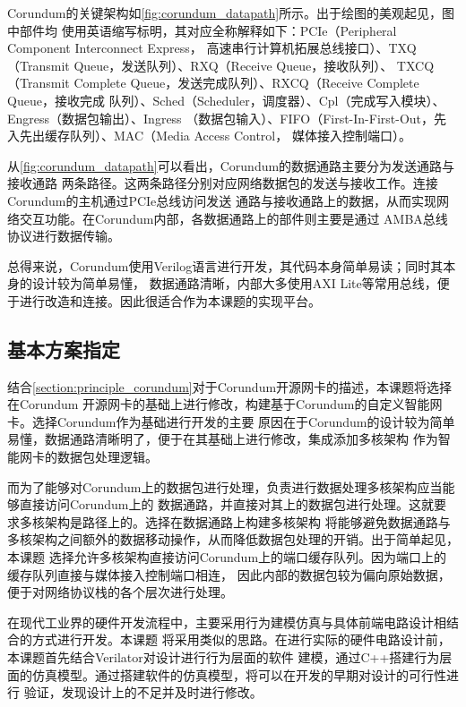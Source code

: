 Corundum的关键架构如\autoref{fig:corundum_datapath}所示。出于绘图的美观起见，图中部件均
使用英语缩写标明，其对应全称解释如下：PCIe（Peripheral Component Interconnect Express，
高速串行计算机拓展总线接口）、TXQ（Transmit Queue，发送队列）、RXQ（Receive Queue，接收队列）、
TXCQ（Transmit Complete Queue，发送完成队列）、RXCQ（Receive Complete Queue，接收完成
队列）、Sched（Scheduler，调度器）、Cpl（完成写入模块）、Engress（数据包输出）、Ingress
（数据包输入）、FIFO（First-In-First-Out，先入先出缓存队列）、MAC（Media Access Control，
媒体接入控制端口）。


从\autoref{fig:corundum_datapath}可以看出，Corundum的数据通路主要分为发送通路与接收通路
两条路径。这两条路径分别对应网络数据包的发送与接收工作。连接Corundum的主机通过PCIe总线访问发送
通路与接收通路上的数据，从而实现网络交互功能。在Corundum内部，各数据通路上的部件则主要是通过
AMBA总线协议\cite{arm2011axi}进行数据传输。

总得来说，Corundum使用Verilog语言进行开发，其代码本身简单易读；同时其本身的设计较为简单易懂，
数据通路清晰，内部大多使用AXI Lite等常用总线，便于进行改造和连接。因此很适合作为本课题的实现平台。

\subsection{基本方案指定}
\label{section:principle_basicpath}


结合\autoref{section:principle_corundum}对于Corundum开源网卡的描述，本课题将选择在Corundum
开源网卡的基础上进行修改，构建基于Corundum的自定义智能网卡。选择Corundum作为基础进行开发的主要
原因在于Corundum的设计较为简单易懂，数据通路清晰明了，便于在其基础上进行修改，集成添加多核架构
作为智能网卡的数据包处理逻辑。

而为了能够对Corundum上的数据包进行处理，负责进行数据处理多核架构应当能够直接访问Corundum上的
数据通路，并直接对其上的数据包进行处理。这就要求多核架构是路径上的。选择在数据通路上构建多核架构
将能够避免数据通路与多核架构之间额外的数据移动操作，从而降低数据包处理的开销。出于简单起见，本课题
选择允许多核架构直接访问Corundum上的端口缓存队列。因为端口上的缓存队列直接与媒体接入控制端口相连，
因此内部的数据包较为偏向原始数据，便于对网络协议栈的各个层次进行处理。

在现代工业界的硬件开发流程中，主要采用行为建模仿真与具体前端电路设计相结合的方式进行开发。本课题
将采用类似的思路。在进行实际的硬件电路设计前，本课题首先结合Verilator对设计进行行为层面的软件
建模，通过C++搭建行为层面的仿真模型。通过搭建软件的仿真模型，将可以在开发的早期对设计的可行性进行
验证，发现设计上的不足并及时进行修改。

